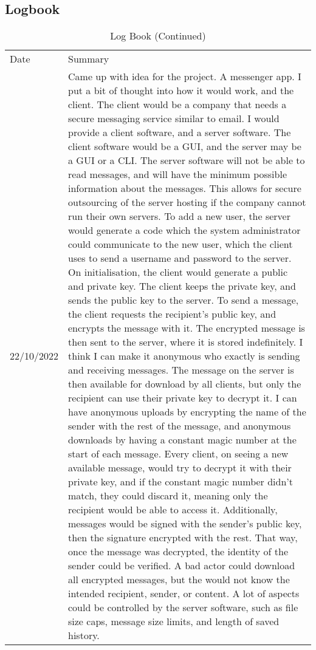 \documentclass{article}
\begin{document}
\subsection{Logbook}
{
\centering
\begin{longtable}{p{}p{}}
\caption{Log Book}\\
\endfirsthead
\caption{Log Book (Continued)}\\
\midrule
\endhead
\toprule
Date & Summary\\
\midrule
22/10/2022 & Came up with idea for the project. A messenger app. I put a bit of thought into how it would work, and the client. The client would be a company that needs a secure messaging service similar to email. I would provide a client software, and a server software. The client software would be a GUI, and the server may be a GUI or a CLI. The server software will not be able to read messages, and will have the minimum possible information about the messages. This allows for secure outsourcing of the server hosting if the company cannot run their own servers. To add a new user, the server would generate a code which the system administrator could communicate to the new user, which the client uses to send a username and password to the server. On initialisation, the client would generate a public and private key. The client keeps the private key, and sends the public key to the server. To send a message, the client requests the recipient's public key, and encrypts the message with it. The encrypted message is then sent to the server, where it is stored indefinitely. I think I can make it anonymous who exactly is sending and receiving messages. The message on the server is then available for download by all clients, but only the recipient can use their private key to decrypt it. I can have anonymous uploads by encrypting the name of the sender with the rest of the message, and anonymous downloads by having a constant magic number at the start of each message. Every client, on seeing a new available message, would try to decrypt it with their private key, and if the constant magic number didn't match, they could discard it, meaning only the recipient would be able to access it. Additionally, messages would be signed with the sender's public key, then the signature encrypted with the rest. That way, once the message was decrypted, the identity of the sender could be verified. A bad actor could download all encrypted messages, but the would not know the intended recipient, sender, or content. A lot of aspects could be controlled by the server software, such as file size caps, message size limits, and length of saved history.\\

\end{longtable}}
\end{document}
